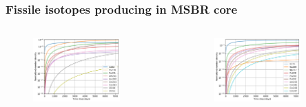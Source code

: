 \documentclass[9pt]{beamer}
\begin{document}
\begin{frame}
  \frametitle{Fissile isotopes producing in \gls{MSBR} core}
  \begin{columns}
    \column[t]{6cm}
               \begin{figure}[t]
                \vspace*{-0.1in}
                \includegraphics[height=0.75\textwidth]{./images/fissile_short.png}
               \end{figure}
    \column[t]{6cm}
               \begin{figure}[t]
                \vspace*{-0.1in}
                \includegraphics[height=0.75\textwidth]{./images/fissile_long.png}
               \end{figure}
    \end{columns}              
\end{frame}
\end{document}
